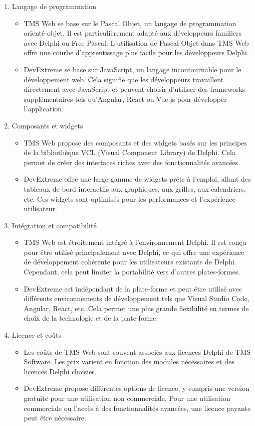 \documentclass[a4paper, 12pt, french]{article}
\newcommand{\bdot}{\item[\color{ssiYellow}\ding{108}]}
\begin{document}
							\begin{enumerate}
								\item Langage de programmation
									\begin{itemize}
										\bdot{TMS Web se base sur le Pascal Objet, un langage de programmation orienté objet. Il est particulièrement adapté aux développeurs familiers avec Delphi ou Free Pascal. L'utilisation de Pascal Objet dans TMS Web offre une courbe d'apprentissage plus facile pour les développeurs Delphi.}
										\bdot{DevExtreme se base sur JavaScript, un langage incontournable pour le développement web. Cela signifie que les développeurs travaillent directement avec JavaScript et peuvent choisir d'utiliser des frameworks supplémentaires tels qu'Angular, React ou Vue.js pour développer l'application.}
									\end{itemize}

								\item Composants et widgets
									\begin{itemize}
										\bdot{TMS Web propose des composants et des widgets basés sur les principes de la bibliothèque VCL (Visual Component Library) de Delphi. Cela permet de créer des interfaces riches avec des fonctionnalités avancées.}
										\bdot{DevExtreme offre une large gamme de widgets prêts à l'emploi, allant des tableaux de bord interactifs aux graphiques, aux grilles, aux calendriers, etc. Ces widgets sont optimisés pour les performances et l'expérience utilisateur.}
									\end{itemize}
	
								\item Intégration et compatibilité
									\begin{itemize}
										\bdot{TMS Web est étroitement intégré à l'environnement Delphi. Il est conçu pour être utilisé principalement avec Delphi, ce qui offre une expérience de développement cohérente pour les utilisateurs existants de Delphi. Cependant, cela peut limiter la portabilité vers d'autres plates-formes.}
										\bdot{DevExtreme est indépendant de la plate-forme et peut être utilisé avec différents environnements de développement tels que Visual Studio Code, Angular, React, etc. Cela permet une plus grande flexibilité en termes de choix de la technologie et de la plate-forme.}
									\end{itemize}

								\item Licence et coûts
									\begin{itemize}
										\bdot{Les coûts de TMS Web sont souvent associés aux licences Delphi de TMS Software. Les prix varient en fonction des modules nécessaires et des licences Delphi choisies.}
										\bdot{DevExtreme propose différentes options de licence, y compris une version gratuite pour une utilisation non commerciale. Pour une utilisation commerciale ou l'accès à des fonctionnalités avancées, une licence payante peut être nécessaire.}
									\end{itemize}


\end{enumerate}
\end{document}
